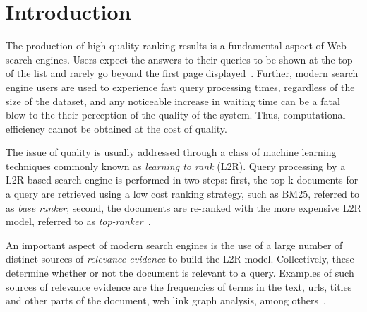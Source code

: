 \documentclass[preprint,review,10pt,3p]{elsarticle}
\begin{document}


\section{Introduction}
\label{intro}

The production of high quality ranking results is a fundamental aspect of Web search engines. Users expect the answers to their queries to be shown at the top of the list and rarely go beyond the first page displayed~\cite{saraiva2001rank}. 
Further, modern search engine users are used to experience fast query processing times, regardless of the size of the dataset, and any noticeable increase in waiting time can be a fatal blow to the their perception of the quality of the system. Thus,
computational efficiency cannot be obtained at the cost of quality. 

The issue of quality is usually addressed through a class of machine learning techniques commonly known as \textit{learning to rank} (L2R). Query processing by a L2R-based search engine is performed in two steps: first, the top-k documents for a query are retrieved using a low cost ranking strategy, such as BM25, referred to as \emph{base ranker}; second, the documents are re-ranked with the more expensive L2R model, referred to as \emph{top-ranker}~\cite{capannini2016quality}.

An important aspect of modern search engines is the use of a large number of distinct sources of \emph{relevance evidence} to build the L2R model. Collectively, these determine whether or not the document is relevant to a query. Examples of such sources of relevance evidence are the frequencies of terms in the text, urls, titles and other parts of the document,
web link graph analysis,
among others~\cite{baezaribeiro2011modinforet}. 
\end{document}
